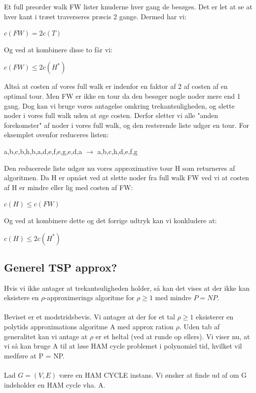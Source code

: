 \documentclass{article}
\begin{document}
Et full preorder walk FW lister knuderne hver gang de besøges. Det er let at se at hver kant i træet traverseres præcis 2 gange. Dermed har vi:
\begin{center}
	$c(FW) = 2c(T)$
\end{center}
Og ved at kombinere disse to får vi:
\begin{center}
	$c(FW) \le 2c(H^*)$ 
\end{center}
Altså at costen af vores full walk er indenfor en faktor af  2 af costen af en optimal tour. Men FW er ikke en tour da den besøger nogle noder mere end 1 gang. Dog kan vi bruge vores antagelse omkring trekantsuligheden, og slette noder i vores full walk uden at øge costen. Derfor sletter vi alle "anden forekomster" af noder i vores full walk, og den resterende liste udgør en tour. For eksemplet ovenfor reduceres listen:
\begin{center}
	a,b,c,b,h,b,a,d,e,f,e,g,e,d,a $\rightarrow$ a,b,c,h,d,e,f,g
\end{center}
Den reducerede liste udgør nu vores approximative tour H som returneres af algoritmen. Da H er opnået ved at slette noder fra full walk FW ved vi at costen af H er mindre eller lig med costen af FW:
\begin{center}
	$c(H) \le c(FW)$
\end{center}
Og ved at kombinere dette og det forrige udtryk kan vi konkludere at:
\begin{center}
	$c(H) \le 2c(H^*)$
\end{center}
\subsection{Generel TSP approx?}
Hvis vi ikke antager at trekantsuligheden holder, så kan det vises at der ikke kan eksistere en $\rho$-approximerings algoritme for $\rho \ge 1$ med mindre $P = NP$.\\\\
Beviset er et modstridsbevis. Vi antager at der for et tal $\rho \ge 1$ eksisterer en polytids approximations algoritme A med approx ration $\rho$. Uden tab af generalitet kan vi antage at $\rho$ er et heltal (ved at runde op ellers). Vi viser nu, at vi så kan bruge A til at løse HAM cycle problemet i polynomiel tid, hvilket vil medføre at P = NP.\\\\
Lad $G = (V,E)$ være en HAM CYCLE instans. Vi ønsker at finde ud af om G indeholder en HAM cycle vha. A. \\\\
\end{document}
